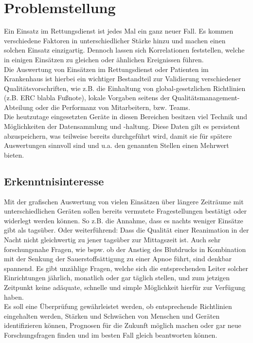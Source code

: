 \documentclass[12pt]{article}
\begin{document}
\maketitle
\clearpage

\tableofcontents
\clearpage

\section{Problemstellung}\label{problem}
Ein Einsatz im Rettungsdienst ist jedes Mal ein ganz neuer Fall. Es kommen verschiedene Faktoren in unterschiedlicher Stärke hinzu und machen einen solchen Einsatz einzigartig. Dennoch lassen sich Korrelationen feststellen, welche in einigen Einsätzen zu gleichen oder ähnlichen Ereignissen führen. \\
Die Auswertung von Einsätzen im Rettungsdienst oder Patienten im Krankenhaus ist hierbei ein wichtiger Bestandteil zur Validierung verschiedener Qualitätsvorschriften, wie z.B. die Einhaltung von global-gesetzlichen  Richtlinien (z.B. ERC blabla Fußnote), lokale Vorgaben seitens der Qualitätsmanagement-Abteilung oder die Performanz von Mitarbeitern, bzw. Teams. \\
Die heutzutage eingesetzten Geräte in diesen Bereichen besitzen viel Technik und Möglichkeiten der Datensammlung und -haltung. Diese Daten gilt es persistent abzuspeichern, was teilweise bereits durchgeführt wird, damit sie für spätere Auswertungen sinnvoll sind und u.a. den genannten Stellen einen Mehrwert bieten.


\subsection{Erkenntnisinteresse}\label{Erkenntnisinteresse}
Mit der grafischen Auswertung von vielen Einsätzen über längere Zeiträume mit unterschiedlichen Geräten sollen bereits vermutete Fragestellungen bestätigt oder widerlegt werden können. 
So z.B. die Annahme, dass es nachts weniger Einsätze gibt als tagsüber. Oder weiterführend: Dass die Qualität einer Reanimation in der Nacht nicht gleichwertig zu jener tagsüber zur Mittagszeit ist. Auch sehr forschungsnahe Fragen, 
wie bspw. ob der Anstieg des Blutdrucks in Kombination mit der Senkung der Sauerstoffsättigung zu einer Apnoe führt, sind denkbar spannend.
Es gibt unzählige Fragen, welche sich die entsprechenden Leiter solcher Einrichtungen jährlich, monatlich oder gar täglich stellen, und zum jetzigen Zeitpunkt keine adäquate, schnelle und simple Möglichkeit hierfür zur Verfügung haben. \\
Es soll eine Überprüfung gewährleistet werden, ob entsprechende Richtlinien eingehalten werden, Stärken und Schwächen von Menschen und Geräten identifizieren können, Prognosen für die Zukunft 
möglich machen oder gar neue Forschungsfragen finden und im besten Fall gleich beantworten können.
\end{document}
